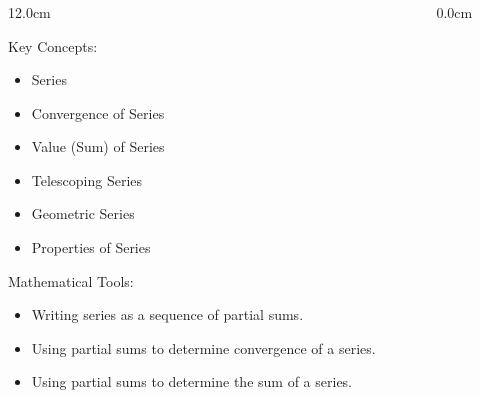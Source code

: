 %

\begin{frame}
\frametitle{\Large {\color[rgb]{0.02,0.20,1.0} }}
\scriptsize
\begin{columns}
\begin{column}{12.0cm}
\vspace{0.4cm}

\begin{block}{Key Concepts:}
\begin{itemize}
	\item[...] Series
	\item[...] Convergence of Series
	\item[...] Value (Sum) of Series
	\item[...] Telescoping Series
	\item[...] Geometric Series
	\item[...] Properties of Series
\end{itemize}
\end{block}

\vspace{0.6cm}

\begin{block}{Mathematical Tools:}
\begin{itemize}
	\item[...] Writing series as a sequence of partial sums.
	\item[...] Using partial sums to determine convergence of a series.
	\item[...] Using partial sums to determine the sum of a series.
\end{itemize}
\end{block}

\vspace{1.0cm}

\end{column}
\begin{column}{0.0cm}\end{column}
\end{columns}
\end{frame}


